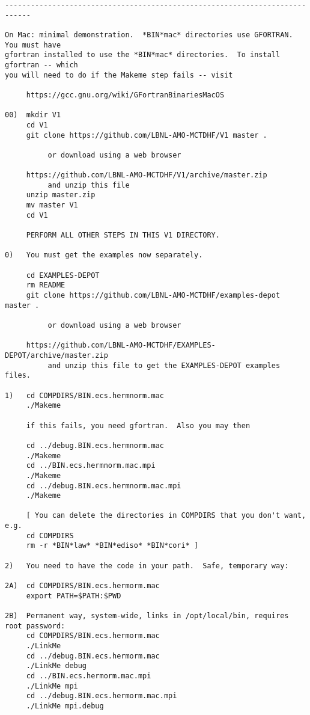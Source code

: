 \begin{verbatim}
----------------------------------------------------------------------------

On Mac: minimal demonstration.  *BIN*mac* directories use GFORTRAN.  You must have
gfortran installed to use the *BIN*mac* directories.  To install gfortran -- which
you will need to do if the Makeme step fails -- visit 

     https://gcc.gnu.org/wiki/GFortranBinariesMacOS

00)  mkdir V1
     cd V1
     git clone https://github.com/LBNL-AMO-MCTDHF/V1 master .

          or download using a web browser

     https://github.com/LBNL-AMO-MCTDHF/V1/archive/master.zip
          and unzip this file
     unzip master.zip
     mv master V1
     cd V1

     PERFORM ALL OTHER STEPS IN THIS V1 DIRECTORY.

0)   You must get the examples now separately.

     cd EXAMPLES-DEPOT
     rm README
     git clone https://github.com/LBNL-AMO-MCTDHF/examples-depot master .

          or download using a web browser

     https://github.com/LBNL-AMO-MCTDHF/EXAMPLES-DEPOT/archive/master.zip
          and unzip this file to get the EXAMPLES-DEPOT examples files.

1)   cd COMPDIRS/BIN.ecs.hermnorm.mac
     ./Makeme

     if this fails, you need gfortran.  Also you may then

     cd ../debug.BIN.ecs.hermnorm.mac
     ./Makeme
     cd ../BIN.ecs.hermnorm.mac.mpi
     ./Makeme
     cd ../debug.BIN.ecs.hermnorm.mac.mpi
     ./Makeme

     [ You can delete the directories in COMPDIRS that you don't want, e.g.
     cd COMPDIRS
     rm -r *BIN*law* *BIN*ediso* *BIN*cori* ]

2)   You need to have the code in your path.  Safe, temporary way:

2A)  cd COMPDIRS/BIN.ecs.hermorm.mac
     export PATH=$PATH:$PWD

2B)  Permanent way, system-wide, links in /opt/local/bin, requires root password:
     cd COMPDIRS/BIN.ecs.hermorm.mac
     ./LinkMe
     cd ../debug.BIN.ecs.hermorm.mac
     ./LinkMe debug
     cd ../BIN.ecs.hermorm.mac.mpi
     ./LinkMe mpi
     cd ../debug.BIN.ecs.hermorm.mac.mpi
     ./LinkMe mpi.debug


\end{verbatim}
